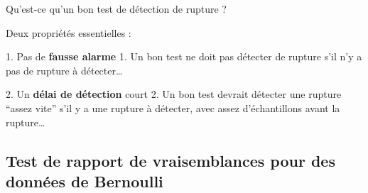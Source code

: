 \documentclass[11pt,french,ignorenonframetext,]{beamer}
\begin{document}
\begin{frame}{Qu'est-ce qu'un bon test de détection de rupture ?}

  Deux propriétés essentielles :

  \begin{block}{1. Pas de \textbf{fausse alarme}}
    1. Un bon test ne doit pas détecter de rupture s'il n'y a pas de rupture à détecter\ldots

  \end{block}

  \begin{block}{2. Un \textbf{délai de détection} court}
    2. Un bon test devrait détecter une rupture ``assez vite'' s'il y a une rupture à détecter, avec assez d'échantillons avant la rupture\ldots

  \end{block}


\end{frame}


\subsection{\hfill{}Test de rapport de vraisemblances pour des données de Bernoulli\hfill{}}
\end{document}
